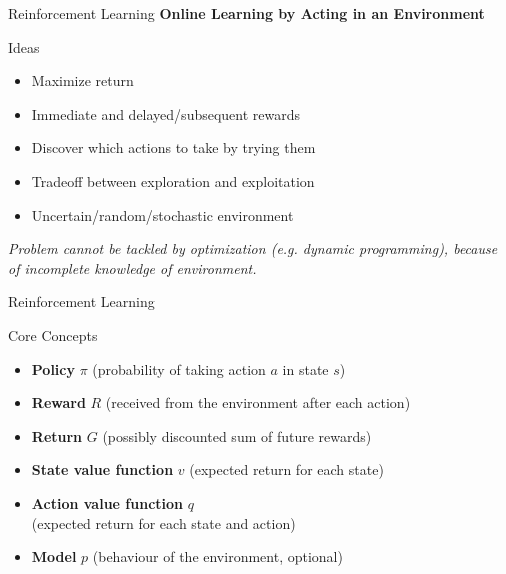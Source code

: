 \documentclass[ignorenonframetext,xcolor=x11names]{beamer}
\begin{document}
\begin{frame}{Reinforcement Learning}
\centering  \textbf{Online Learning by Acting in an Environment}
\vspace{\baselineskip}  
\begin{block}{Ideas}
\begin{itemize}
   \item Maximize return
   \item Immediate and delayed/subsequent rewards
   \item Discover which actions to take by trying them
   \item Tradeoff between exploration and exploitation
   \item Uncertain/random/stochastic environment
\end{itemize}
\end{block} 
\vspace{\baselineskip} \centering
\emph{Problem cannot be tackled by optimization (e.g. dynamic programming), because of incomplete knowledge of environment.}
\end{frame}

\begin{frame}{Reinforcement Learning}
\begin{block}{Core Concepts}
\begin{itemize}
    \item \textbf{Policy} $\pi$ (probability of taking action $a$ in state $s$)
    \item \textbf{Reward} $R$ (received from the environment after each action)
    \item \textbf{Return} $G$ (possibly discounted sum of future rewards)
    \item \textbf{State value function} $v$ (expected return for each state)
    \item \textbf{Action value function} $q$ \\ (expected return for each state and action)
    \item \textbf{Model} $p$ (behaviour of the environment, optional)
\end{itemize}
\end{block}
\end{frame}
\end{document}
